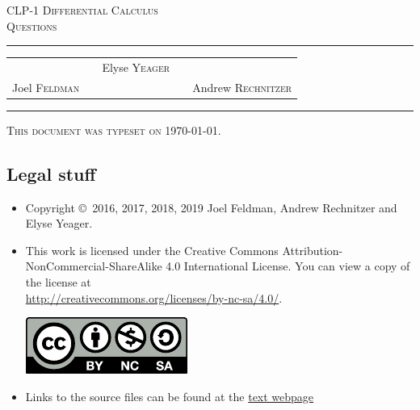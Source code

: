 \documentclass[12pt,letterpaper]{book}
\begin{document}
\setcounter{page}{0}

\begin{titlepage}
\begin{center}
\textsc{\LARGE
CLP-1 Differential Calculus\\[2ex]
Questions
}\\[2ex]

\vspace{5ex}
\hrule
\vspace{5ex}

\begin{tabular}{lcccr}
&& \large Elyse \textsc{Yeager} \\[3ex]
 Joel \textsc{Feldman}
&\quad & &\quad&
Andrew \textsc{Rechnitzer}
\end{tabular}

\end{center}
\vspace{2ex}
\hrule

\vfill
\textsc{This document was typeset on \today.}
\end{titlepage}

\subsection*{Legal stuff}
\begin{itemize}
 \item Copyright \copyright\ 2016, 2017, 2018, 2019 Joel Feldman, Andrew Rechnitzer and Elyse Yeager.

\item This work is licensed under the
Creative Commons Attribution-NonCommercial-ShareAlike 4.0 International
License. You can view a copy of the license at \\
\url{http://creativecommons.org/licenses/by-nc-sa/4.0/}.
\begin{center}
 \includegraphics{by-nc-sa.pdf}
\end{center}


\item Links to the source files can be found at the \href{http://www.math.ubc.ca/~CLP/index.html}{text webpage}
\end{itemize}
\end{document}

